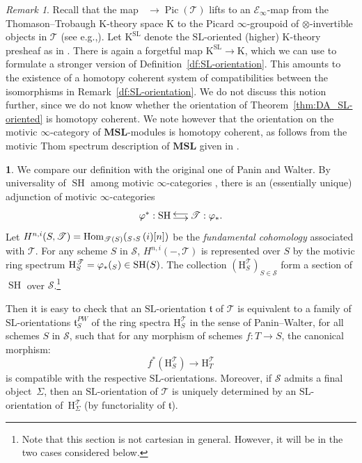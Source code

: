 \documentclass[11pt]{article}
\makeatletter
\newcommand{\eg}{e.g.,\xspace}
\numberwithin{equation}{section}\renewcommand{\encodingdefault}{TU}
\DeclareRobustCommand{\mathbbm}[1]{\csname jepbb@#1\endcsname}
\newcommand{\base}{\mathscr S}
\newcommand{\T}{\mathscr T}
\DeclareMathOperator{\uK}{\underline K}
\newcommand{\un}{\mathbbm 1}
\newcommand{\MSL}{\mathbf{MSL}}
\newcommand{\HH}{\mathrm H}
\newcommand{\SL}{\mathrm{SL}}
\newcommand{\thom}{\mathfrak t}
\DeclareMathOperator{\SH}{SH}
\DeclareMathOperator{\Hom}{Hom}
\DeclareMathOperator{\Pic}{Pic}
\theoremstyle{remark}
\newtheorem{rem}[thm]{Remark}
\theoremstyle{definition}
\newtheorem{num}[thm]{}
\numberwithin{equation}{thm}
\makeatother
\begin{document}
\begin{rem}
Recall that the map $\uK \to \Pic(\T)$ lifts to an $\mathcal{E}_\infty$-map from the Thomason--Trobaugh K-theory space $\mathrm{K}$ to the Picard $\infty$-groupoid of $\otimes$-invertible objects in $\T$ (see \eg \cite[\S16.2]{BachmannHoyois}).
Let $\mathrm{K}^\SL$ denote the $\SL$-oriented (higher) K\nobreakdash-theory presheaf as in \cite[Ex.\,16.20]{BachmannHoyois}.
There is again a forgetful map $\mathrm{K}^\SL \to \mathrm{K}$, which we can use to formulate a stronger version of Definition~\ref{df:SL-orientation}.
This amounts to the existence of a homotopy coherent system of compatibilities between the isomorphisms in Remark~\ref{df:SL-orientation}.
We do not discuss this notion further, since we do not know whether the orientation of Theorem~\ref{thm:DA_SL-oriented} is homotopy coherent.
We note however that the orientation on the motivic $\infty$-category of $\MSL$-modules is homotopy coherent, as follows from the motivic Thom spectrum description of $\MSL$ given in \cite[\S 16]{BachmannHoyois}.
\end{rem}

\begin{num}
We compare our definition with the original one of Panin and Walter.
By universality of $\SH$ among motivic $\infty$-categories \cite{Rob}, there is an (essentially unique) adjunction of motivic $\infty$-categories
\[
\xymatrix@C=.5cm{
\varphi^*:\SH\ar@<-.5ex>[r]&\ar@<-.5ex>[l] \T:\varphi_*.
}
\]
Let $H^{n,i}(S,\T)=\Hom_{\T(S)}(\un_S,\un_S(i)[n])$ be the
\emph{fundamental cohomology} associated with $\T$.
For any scheme $S$ in $\base$, $H^{n,i}(-,\T)$ is represented over $S$ by the motivic ring spectrum $\HH^\T_S=\varphi_*(\un_S)\in\SH(S)$.
The collection $(\HH^\T_S)_{S \in \base}$ form a section of $\SH$ over $\base$.\footnote{Note
that this section is not cartesian in general. However, it will be in the two cases considered below.}

Then it is easy to check that an $\SL$-orientation $\thom$ of $\T$ is equivalent
to a family of $\SL$-orientations $\thom^{PW}_S$ of the ring spectra $\HH^\T_S$
in the sense of Panin--Walter, for all schemes $S$ in $\base$, such that for any morphism of schemes $f:T \to S$,
the canonical morphism:
\[
f^*(\HH^\T_S) \to \HH^\T_T
\]
is compatible with the respective $\SL$-orientations.
Moreover, if $\base$ admits a final object~$\Sigma$,
then an $\SL$-orientation of $\T$ is uniquely determined by an $\SL$-orientation
of~$\HH^\T_\Sigma$ (by functoriality of $\thom$).
\end{num}
\end{document}
